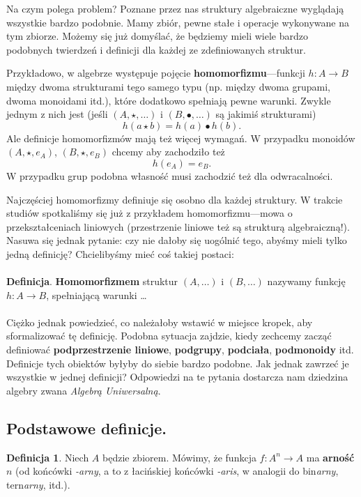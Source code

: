 \documentclass{book}
\theoremstyle{definition}
\newtheorem{definition}{Definicja}[section]
\begin{document}
Na czym polega problem?
Poznane przez nas struktury algebraiczne wyglądają wszystkie bardzo podobnie.
Mamy zbiór, pewne stałe i operacje wykonywane na tym zbiorze.
Możemy się już domyślać,
	że będziemy mieli wiele bardzo podobnych twierdzeń i definicji dla każdej ze zdefiniowanych struktur.

Przykładowo,
	w algebrze występuje pojęcie \textbf{homomorfizmu}---funkcji $h: A \to B$ między dwoma strukturami
	tego samego typu (np. między dwoma grupami, dwoma monoidami itd.),
	które dodatkowo spełniają pewne warunki.
Zwykle jednym z nich jest (jeśli $(A, \star, \dots)$ i $(B, \bullet, \dots)$ są jakimiś strukturami)
\begin{equation}
	h(a\star b) = h(a) \bullet h(b).
\end{equation}
Ale definicje homomorfizmów mają też więcej wymagań.
W przypadku monoidów $(A, \star, e_A)$, $(B, \star, e_B)$ chcemy aby zachodziło też
\begin{equation}
	h(e_A) = e_B.
\end{equation}
W przypadku grup podobna własność musi zachodzić też dla odwracalności.

Najczęściej homomorfizmy definiuje się osobno dla każdej struktury.
W trakcie studiów spotkaliśmy się już z przykładem homomorfizmu---mowa o przekształceniach liniowych
	(przestrzenie liniowe też są strukturą algebraiczną!).
Nasuwa się jednak pytanie: czy nie dałoby się uogólnić tego,
	abyśmy mieli tylko jedną definicję?
Chcielibyśmy mieć coś takiej postaci:
\\\\
\noindent \textbf{Definicja}.
	\textbf{Homomorfizmem} struktur $(A, \dots)$ i $(B, \dots)$ nazywamy funkcję $h: A \to B$,
	spełniającą warunki \dots
\\\\
Ciężko jednak powiedzieć, co należałoby wstawić w miejsce kropek, aby sformalizować tę definicję.
Podobna sytuacja zajdzie,
    kiedy zechcemy zacząć definiować
	\textbf{podprzestrzenie liniowe}, \textbf{podgrupy}, \textbf{podciała}, \textbf{podmonoidy} itd.
Definicje tych obiektów byłyby do siebie bardzo podobne.
Jak jednak zawrzeć je wszystkie w jednej definicji?
Odpowiedzi na te pytania dostarcza nam dziedzina algebry zwana \textit{Algebrą Uniwersalną}.

\subsection{Podstawowe definicje.}

\begin{definition}
	Niech $A$ będzie zbiorem.
	Mówimy, że funkcja $f: A^n \to A$ ma \textbf{arność} $n$ (od końcówki \textit{-arny},
	a to z łacińskiej końcówki \textit{-aris},
	w analogii do bin\textit{arny}, tern\textit{arny}, itd.).
\end{definition}
\end{document}
